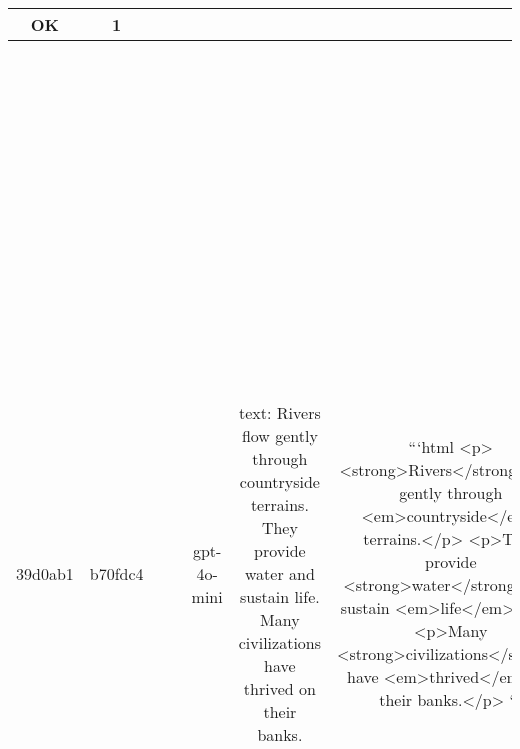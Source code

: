 \begin{table}[h!]
\begin{tabular}{|c|c|c|c|c|c|c|c|c|c|}
OK & 1\\
\hline
39d0ab1 & b70fdc4 &  &  & gpt-4o-mini & text: Rivers flow gently through countryside terrains. They provide water and sustain life. Many civilizations have thrived on their banks. & ```html
<p><strong>Rivers</strong> flow gently through <em>countryside</em> terrains.</p>
<p>They provide <strong>water</strong> and sustain <em>life</em>.</p>
<p>Many <strong>civilizations</strong> have <em>thrived</em> on their banks.</p>
``` & ok & The chatbot output consists of three paragraphs, each enclosed within <p> tags, which meets the specification of having at least three <p> tags. Within these paragraphs, there is proper usage of <strong> and <em> tags, with each paragraph containing at least one <strong> tag and multiple <em> tags, which complies with the requirement to emphasize key words and phrases within each sentence.

No violation.
OK & 1\\
\hline
d7ef874 & b70fdc4 &  &  & gpt-4o-mini & text: Fashion often reflects cultural influences. Designers innovate with colors and patterns. Trends change, but personal style remains timeless. & ```html
<p><strong>Fashion</strong> often <em>reflects</em> cultural <em>influences</em>.</p>
<p><strong>Designers</strong> <em>innovate</em> with <em>colors</em> and <em>patterns</em>.</p>
<p><strong>Trends</strong> change, but <em>personal style</em> remains <strong>timeless</strong>.</p>
``` & ok & The chatbot output provides three `<p>` tags, which complies with the requirement of having at least three `<p>` tags. Each `<p>` tag includes at least one `<strong>` tag and multiple `<em>` tags, which are used to emphasize key words and phrases within each sentence.

First `<p>` tag:
- Contains the sentence "Fashion often reflects cultural influences."
- The word "Fashion" is emphasized with a `<strong>` tag.
- The words "reflects" and "influences" are emphasized with `<em>` tags.

Second `<p>` tag:
- Contains the sentence "Designers innovate with colors and patterns."
- The word "Designers" is emphasized with a `<strong>` tag.
- The words "innovate," "colors," and "patterns" are emphasized with `<em>` tags.

Third `<p>` tag:
- Contains the sentence "Trends change, but personal style remains timeless."
- The word "Trends" is emphasized with a `<strong>` tag.
- The phrase "personal style" is emphasized with `<em>` tags.
- The word "timeless" is erroneously emphasized with a `<strong>` tag instead of `<em>`, but this does not violate the description, as the presence of one `<strong>` tag per `<p>` meets the requirement.


\end{tabular}
\end{table}
